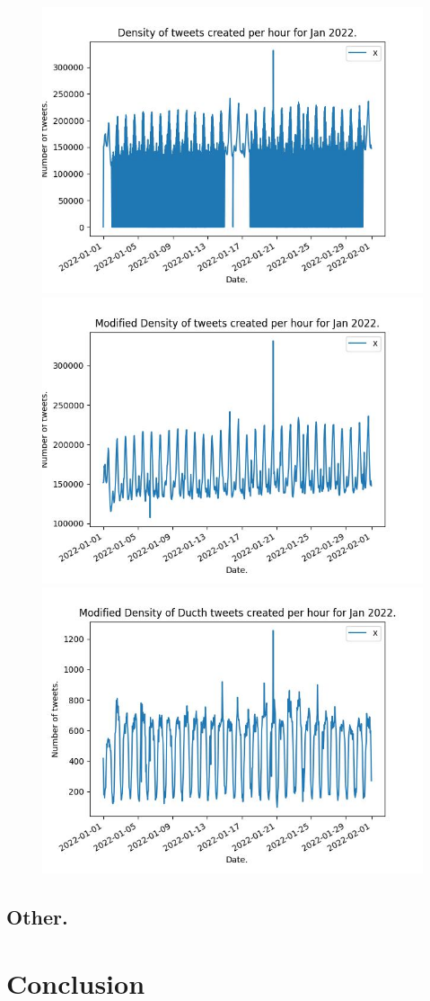 \documentclass[9pt]{article}
\begin{document}
\begin{figure}[h!]
    \center
    \includegraphics[scale=0.3]{figures/JanAllraw.jpeg}
    \includegraphics[scale=0.3]{figures/JanAllmod.jpeg}
    \includegraphics[scale=0.3]{figures/JanNLmod.jpeg}
\end{figure}
\subsection{Other.}
\section{Conclusion}
\end{document}

